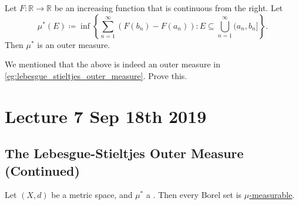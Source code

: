\documentclass[notoc,notitlepage]{tufte-book}
\begin{document}
\begin{defn}\label{defn:lebesgue_stieltjes_outer_measure}
  Let $F : \mathbb{R} \to \mathbb{R}$ be an increasing function
  that is continuous from the right.
  Let
  \begin{equation*}
    \mu^*(E) \coloneqq \inf \left\{ 
      \sum_{n=1}^{\infty} ( F(b_n) - F(a_n) )
      : E \subseteq \bigcup_{n=1}^{\infty} (a_n, b_n]
    \right\}.
  \end{equation*}
  Then $\mu^*$ is an outer measure.
\end{defn}

\begin{ex}
  We mentioned that the above is indeed an outer measure in
  \cref{eg:lebesgue_stieltjes_outer_measure}.
  Prove this.
\end{ex}



\chapter{Lecture 7 Sep 18th 2019}%
\label{chp:lecture_7_sep_18th_2019}

\section{The Lebesgue-Stieltjes Outer Measure (Continued)}%
\label{sec:the_lebesgue_stieltjes_outer_measure_continued}

\begin{thm}\label{thm:caratheodory_s_second_theorem}
  Let $(X, d)$ be a metric space,
  and $\mu^*$ a .
  Then every Borel set is \hyperref[defn:_mu_measurability]{$\mu$-measurable}.
\end{thm}
\end{document}

